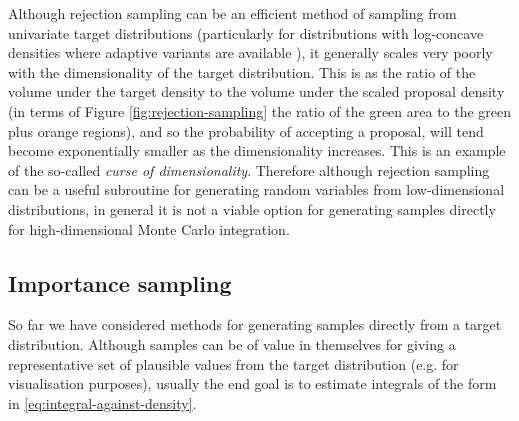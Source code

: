 Although rejection sampling can be an efficient method of sampling from univariate target distributions (particularly for distributions with log-concave densities where adaptive variants are available \citep{gilks1992adaptive}), it generally scales very poorly with the dimensionality of the target distribution. This is as the ratio of the volume under the target density to the volume under the scaled proposal density (in terms of Figure \ref{fig:rejection-sampling} the ratio of the green area to the green plus orange regions), and so the probability of accepting a proposal, will tend become exponentially smaller as the dimensionality increases. This is an example of the so-called \emph{curse of dimensionality}. Therefore although rejection sampling can be a useful subroutine for generating random variables from low-dimensional distributions, in general it is not a viable option for generating samples directly for high-dimensional Monte Carlo integration.

\subsection{Importance sampling}

So far we have considered methods for generating samples directly from a target distribution. Although samples can be of value in themselves for giving a representative set of plausible values from the target distribution (e.g. for visualisation purposes), usually the end goal is to estimate integrals of the form in \eqref{eq:integral-against-density}. 

